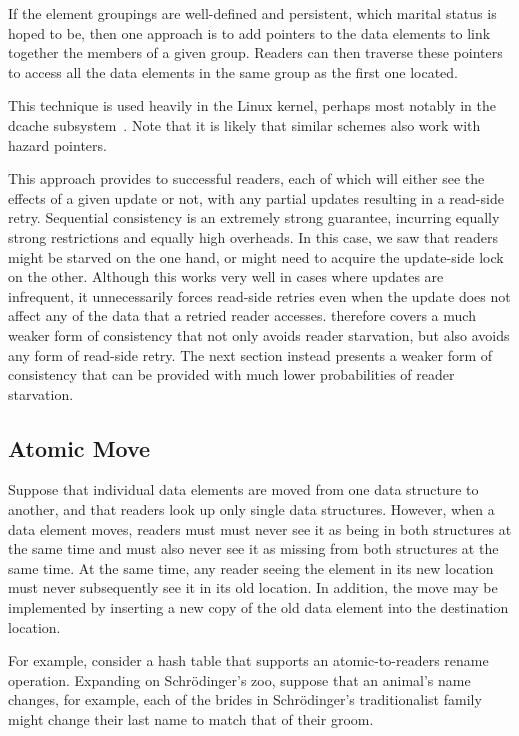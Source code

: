 If the element groupings are well-defined and persistent, which marital
status is hoped to be,
then one approach is to add pointers to the data elements to link
together the members of a given group.
Readers can then traverse these pointers to access all the data elements
in the same group as the first one located.

This technique is used heavily in the Linux kernel, perhaps most
notably in the dcache subsystem~\cite{NeilBrown2015RCUwalk}.
Note that it is likely that similar schemes also work with hazard
pointers.

This approach provides  to successful readers,
each of which will either see the effects of a given update or not,
with any partial updates resulting in a read-side retry.
Sequential consistency is an extremely strong guarantee, incurring equally
strong restrictions and equally high overheads.
In this case, we saw that readers might be starved on the one hand, or
might need to acquire the update-side lock on the other.
Although this works very well in cases where updates are infrequent,
it unnecessarily forces read-side retries even when the update does not
affect any of the data that a retried reader accesses.
 therefore covers a much weaker form
of consistency that not only avoids reader starvation, but also avoids
any form of read-side retry.
The next section instead presents a weaker form of consistency that
can be provided with much lower probabilities of reader starvation.

\subsection{Atomic Move}
\label{sec:together:Atomic Move}

Suppose that individual data elements are moved from one data structure
to another, and that readers look up only single data structures.
However, when a data element moves, readers must must never see it as
being in both structures at the same time and must also never see it as
missing from both structures at the same time.
At the same time, any reader seeing the element in its new location
must never subsequently see it in its old location.
In addition, the move may be implemented by inserting a new copy of the
old data element into the destination location.

For example, consider a hash table that supports an atomic-to-readers
rename operation.
Expanding on Schr\"odinger's zoo, suppose that an animal's name changes,
for example, each of the brides in Schr\"odinger's traditionalist family
might change their last name to match that of their groom.

